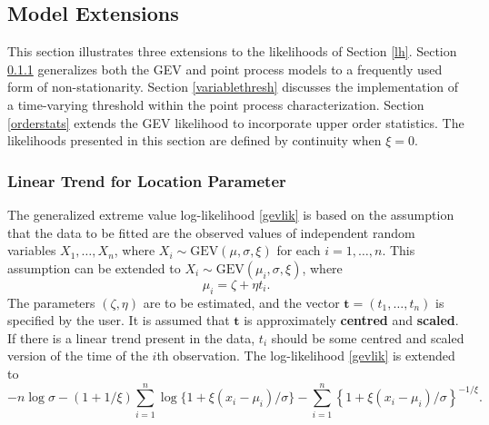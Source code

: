 \documentclass[11pt,a4paper]{article}
\newcommand{\bs}{\boldsymbol}
\begin{document}
\subsection{Model Extensions}
\label{extend}

This section illustrates three extensions to the likelihoods of
Section \ref{lh}.  Section \ref{lineartrend} generalizes both the GEV
and point process models to a frequently used form of
non-stationarity.  Section \ref{variablethresh} discusses the
implementation of a time-varying threshold within the point process
characterization.  Section \ref{orderstats} extends the GEV likelihood
to incorporate upper order statistics.  The likelihoods presented in
this section are defined by continuity when $\xi = 0$.

\subsubsection{Linear Trend for Location Parameter}
\label{lineartrend}

The generalized extreme value log-likelihood \eqref{gevlik} is based
on the assumption that the data to be fitted are the observed values
of independent random variables $X_1,\dots,X_n$, where $X_i \sim
\text{GEV}(\mu,\sigma,\xi)$ for each $i=1,\dots,n$.  This assumption
can be extended to $X_i \sim \text{GEV}(\mu_i,\sigma,\xi)$, where
\begin{equation*}
\mu_i = \zeta + \eta t_i.
\end{equation*}
The parameters $(\zeta,\eta)$ are to be estimated, and the vector
$\bs{t}=(t_1,\dots,t_n)$ is specified by the user.  It is assumed that
$\bs{t}$ is approximately \textbf{centred} and \textbf{scaled}.  If
there is a linear trend present in the data, $t_i$ should be some
centred and scaled version of the time of the $i$th observation.  The
log-likelihood \eqref{gevlik} is extended to
\begin{equation*}
  -n\log \sigma - (1 + 1/\xi) \sum_{i=1}^n \log\{1+ \xi \left(
    x_i-\mu_i \right) /\sigma\} - \sum_{i=1}^n  \left\{ 1 + \xi \left(
      x_i-\mu_i \right) /\sigma  \right\}^{-1/\xi}. 
\end{equation*}
\end{document}
